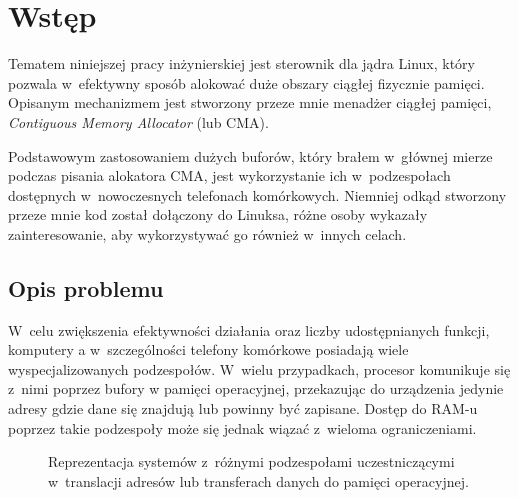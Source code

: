 \chapter{Wstęp}

Tematem niniejszej pracy inżynierskiej jest sterownik dla jądra Linux,
który pozwala w~efektywny sposób alokować duże obszary ciągłej
fizycznie pamięci.  Opisanym mechanizmem jest stworzony przeze mnie
menadżer ciągłej pamięci, {\it Contiguous Memory Allocator} (lub CMA).

Podstawowym zastosowaniem dużych buforów, który brałem w~głównej
mierze podczas pisania alokatora CMA, jest wykorzystanie ich
w~podzespołach dostępnych w~nowoczesnych telefonach komórkowych.
Niemniej odkąd stworzony przeze mnie kod został dołączony do Linuksa,
różne osoby wykazały zainteresowanie, aby wykorzystywać go również
w~innych celach.


\section{Opis problemu}

W~celu zwiększenia efektywności działania oraz liczby udostępnianych
funkcji, komputery a w~szczególności telefony komórkowe posiadają
wiele wyspecjalizowanych podzespołów.  W~wielu przypadkach, procesor
komunikuje się z~nimi poprzez bufory w pamięci operacyjnej,
przekazując do urządzenia jedynie adresy gdzie dane się znajdują lub
powinny być zapisane.  Dostęp do RAM-u poprzez takie podzespoły może
się jednak wiązać z~wieloma ograniczeniami.

\begin{figure}[tbp]
  \centering
   \qquad
  \qquad
  \caption[Różne przestrzenie adresowe dostępne
    w~komputerze.]{Reprezentacja systemów z~różnymi podzespołami
    uczestniczącymi w~translacji adresów lub transferach danych do
    pamięci operacyjnej.}
  \label{fig:mmu-iommu}
\end{figure}

